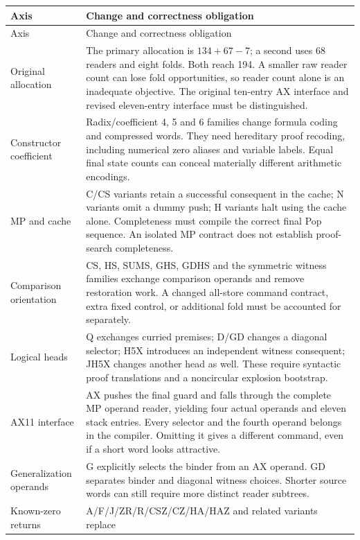 \documentclass[10pt,a4paper]{article}
\theoremstyle{definition}
\begin{document}
\begin{longtable}{@{}>{\raggedright\arraybackslash}p{}>{\raggedright\arraybackslash}p{}@{}}
\toprule Axis & Change and correctness obligation\\\midrule\endfirsthead
\toprule Axis & Change and correctness obligation\\\midrule\endhead
\bottomrule\endfoot
Original allocation & The primary allocation is $134+67-7$; a second uses
68 readers and eight folds. Both reach 194. A smaller raw reader count
can lose fold opportunities, so reader count alone is an inadequate
objective. The original ten-entry AX interface and revised eleven-entry
interface must be distinguished.\\
Constructor coefficient & Radix/coefficient 4, 5 and 6 families change
formula coding and compressed words. They need hereditary proof recoding,
including numerical zero aliases and variable labels. Equal final state
counts can conceal materially different arithmetic encodings.\\
MP and cache & C/CS variants retain a successful consequent in the cache;
N variants omit a dummy push; H variants halt using the cache alone.
Completeness must compile the correct final Pop sequence. An isolated
MP contract does not establish proof-search completeness.\\
Comparison orientation & CS, HS, SUMS, GHS, GDHS and the symmetric witness
families exchange comparison operands and remove restoration work. A
changed all-store command contract, extra fixed control, or additional
fold must be accounted for separately.\\
Logical heads & Q exchanges curried premises; D/GD changes a diagonal
selector; H5X introduces an independent witness consequent; JH5X changes
another head as well. These require syntactic proof translations and a
noncircular explosion bootstrap.\\
AX11 interface & AX pushes the final guard and falls through the complete
MP operand reader, yielding four actual operands and eleven stack entries.
Every selector and the fourth operand belongs in the compiler. Omitting
it gives a different command, even if a short word looks attractive.\\
Generalization operands & G explicitly selects the binder from an AX
operand. GD separates binder and diagonal witness choices. Shorter source
words can still require more distinct reader subtrees.\\
Known-zero returns & A/F/J/ZR/R/CSZ/CZ/HA/HAZ and related variants replace

\end{longtable}
\end{document}
